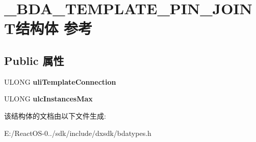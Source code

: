 \hypertarget{struct___b_d_a___t_e_m_p_l_a_t_e___p_i_n___j_o_i_n_t}{}\section{\+\_\+\+B\+D\+A\+\_\+\+T\+E\+M\+P\+L\+A\+T\+E\+\_\+\+P\+I\+N\+\_\+\+J\+O\+I\+N\+T结构体 参考}
\label{struct___b_d_a___t_e_m_p_l_a_t_e___p_i_n___j_o_i_n_t}
\subsection*{Public 属性}
\begin{DoxyCompactItemize}
\item 
\mbox{\label{struct___b_d_a___t_e_m_p_l_a_t_e___p_i_n___j_o_i_n_t_afe4d76faeda00468db017b9e091e9aad}} 
U\+L\+O\+NG {\bfseries uli\+Template\+Connection}
\item 
\mbox{\label{struct___b_d_a___t_e_m_p_l_a_t_e___p_i_n___j_o_i_n_t_a41d1829626ab10d880f4e8e1fabd987c}} 
U\+L\+O\+NG {\bfseries ulc\+Instances\+Max}
\end{DoxyCompactItemize}


该结构体的文档由以下文件生成\+:\begin{DoxyCompactItemize}
\item 
E\+:/\+React\+O\+S-\/0../sdk/include/dxsdk/bdatypes.\+h\end{DoxyCompactItemize}

